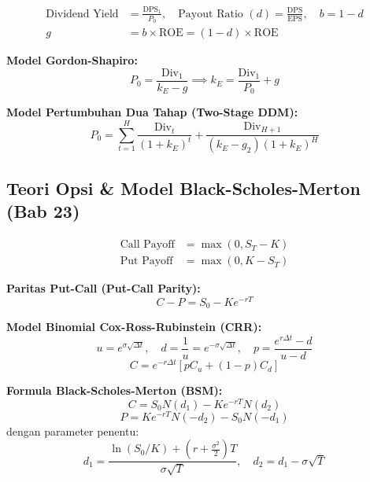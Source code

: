\documentclass[10pt,a4paper]{article}
\begin{document}
\begin{align}
\text{Dividend Yield} &= \frac{\text{DPS}_1}{P_0}, \quad \text{Payout Ratio } (d) = \frac{\text{DPS}}{\text{EPS}}, \quad b = 1 - d \\
g &= b \times \text{ROE} = (1 - d) \times \text{ROE}
\end{align}

\textbf{Model Gordon-Shapiro:}
\begin{equation}
P_0 = \frac{\text{Div}_1}{k_E - g} \implies k_E = \frac{\text{Div}_1}{P_0} + g
\end{equation}

\textbf{Model Pertumbuhan Dua Tahap (Two-Stage DDM):}
\begin{equation}
P_0 = \sum_{t=1}^H \frac{\text{Div}_t}{(1 + k_E)^t} + \frac{\text{Div}_{H+1}}{(k_E - g_2)(1 + k_E)^H}
\end{equation}

\subsection{Teori Opsi \& Model Black-Scholes-Merton (Bab 23)}

\begin{align}
\text{Call Payoff} &= \max(0, S_T - K) \\
\text{Put Payoff} &= \max(0, K - S_T)
\end{align}

\textbf{Paritas Put-Call (Put-Call Parity):}
\begin{equation}
C - P = S_0 - K e^{-rT}
\end{equation}

\textbf{Model Binomial Cox-Ross-Rubinstein (CRR):}
\begin{equation}
u = e^{\sigma\sqrt{\Delta t}}, \quad d = \frac{1}{u} = e^{-\sigma\sqrt{\Delta t}}, \quad p = \frac{e^{r\Delta t} - d}{u - d}
\end{equation}
\begin{equation}
C = e^{-r\Delta t} [p C_u + (1 - p) C_d]
\end{equation}

\textbf{Formula Black-Scholes-Merton (BSM):}
\begin{equation}
\boxed{C = S_0 N(d_1) - K e^{-rT} N(d_2)}
\end{equation}
\begin{equation}
\boxed{P = K e^{-rT} N(-d_2) - S_0 N(-d_1)}
\end{equation}
dengan parameter penentu:
\begin{equation}
d_1 = \frac{\ln(S_0 / K) + \left(r + \frac{\sigma^2}{2}\right)T}{\sigma\sqrt{T}}, \quad d_2 = d_1 - \sigma\sqrt{T}
\end{equation}
\end{document}
